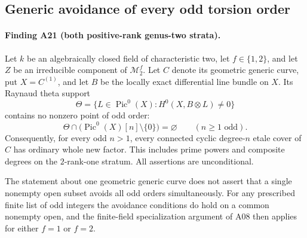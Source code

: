 \subsection{Generic avoidance of every odd torsion order}
\label{sec:generic-all-odd}

\paragraph{Finding A21 (both positive-rank genus-two strata).}
Let $k$ be an algebraically closed field of characteristic two,
let $f\in\{1,2\}$, and let $Z$ be an irreducible component of
$\mathcal M_2^f$.  Let $C$ denote its geometric generic curve,
put $X=C^{(1)}$, and let $B$ be the locally exact differential
line bundle on $X$.  Its Raynaud theta support
\[
 \Theta=\{L\in\operatorname{Pic}^0(X):
                       H^0(X,B\otimes L)\ne0\}
\]
contains no nonzero point of odd order:
\[
 \Theta\cap
 \bigl(\operatorname{Pic}^0(X)[n]\setminus\{0\}\bigr)
             =\varnothing\qquad(n\ge1\text{ odd}).             \tag{GO.1}
\]
Consequently, for every odd $n>1$, every connected cyclic
degree-$n$ etale cover of $C$ has ordinary whole new factor.
This includes prime powers and composite degrees on the
$2$-rank-one stratum.  All assertions are unconditional.

The statement about one geometric generic curve does not
assert that a single nonempty open subset avoids all odd
orders simultaneously.  For any prescribed finite list of
odd integers the avoidance conditions do hold on a common
nonempty open, and the finite-field specialization argument
of A08 then applies for either $f=1$ or $f=2$.

